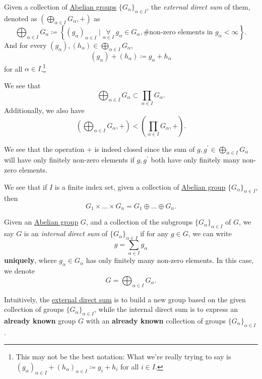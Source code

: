 \begin{definition}\label{def:external-direct-sum}
	Given a collection of \hyperref[def:Abelian-group]{Abelian groups} \(\{G_\alpha \}_{\alpha \in I}\), the \emph{external direct sum} of them, denoted as \(\left(\bigoplus_{\alpha \in I} G_\alpha , +\right)\)
	as
	\[
		\bigoplus_{\alpha \in I}G_\alpha \coloneqq \left\{(g_\alpha )_{\alpha \in I}\mid \underset{\alpha \in I}{\forall }\ g_\alpha \in G_\alpha, \text{\# non-zero elements in \(g_{\alpha} < \infty\)}\right\}.
	\]
	And for every \((g_\alpha ), (h_\alpha )\in \bigoplus_{\alpha \in I}G_\alpha \),
	\[
		(g_\alpha )+(h_\alpha )\coloneqq g_\alpha +h_\alpha
	\]
	for all \(\alpha \in I\).\footnote{This may not be the best notation: What we're really trying to say is \((g_\alpha )_{\alpha \in I}+ (h_\alpha )_{\alpha \in I} \coloneqq g_i + h_i \) for all \(i \in I\).}
\end{definition}
\begin{note}
	We see that
	\[
		\bigoplus_{\alpha \in I}G_\alpha \subset \prod\limits_{\alpha \in I}G_\alpha.
	\]
	Additionally, we also have
	\[
		\left(\bigoplus_{\alpha \in I}G_\alpha , +\right)< \left(\prod\limits_{\alpha \in I}G_\alpha , +\right).
	\]
\end{note}
\begin{remark}
	We see that the operation \(+\) is indeed closed since the sum of \(g, g^\prime \in \bigoplus_{\alpha \in I} G_\alpha \) will have only finitely non-zero elements if
	\(g, g^\prime \) both have only finitely many non-zero elements.
\end{remark}

We see that if \(I\) is a finite index set, given a collection of \hyperref[def:Abelian-group]{Abelian group} \(\{G_\alpha \}_{\alpha \in I}\), then
\[
	G_1 \times \dots \times G_n = G_{1}  \oplus  \dots \oplus G_n.
\]

\begin{definition}\label{def:internal-direct-sum}
	Given an \hyperref[def:Abelian-group]{Abelian group} \(G\), and a collection of the subgroups \(\{G_\alpha \}_{\alpha \in I}\) of \(G\), we say \(G\) is an \emph{internal direct sum}
	of \(\{G_\alpha \}_{\alpha \in I}\) if for any \(g\in G\), we can write
	\[
		g = \sum\limits_{\alpha \in I} g_\alpha
	\]
	\textbf{uniquely}, where \(g_\alpha \in G_\alpha \) has only finitely many non-zero elements. In this case, we denote
	\[
		G = \bigoplus_{\alpha \in I}G_\alpha .
	\]
\end{definition}
Intuitively, the \hyperref[def:external-direct-sum]{external direct sum} is to build a new group based on the given collection of groups \(\{G_\alpha \}_{\alpha \in I}\), while the internal direct sum is
to express an \textbf{already known} group \(G\) with an \textbf{already known} collection of groups \(\{G_\alpha \}_{\alpha \in I}\).

